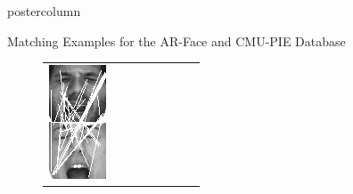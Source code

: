 \documentclass[final,hyperref={pdfpagelabels=false}]{beamer}
\begin{document}
\begin{frame}
\begin{columns}
\begin{column}{.49\textwidth}
\begin{beamercolorbox}[center,wd=\textwidth]{postercolumn}
\begin{minipage}[T]{.95\textwidth}
{\begin{block}{Matching Examples for the AR-Face and CMU-PIE Database}
\begin{figure}
\begin{tabular}{p{.09\linewidth} | p{.12\linewidth} | p{.12\linewidth} | p{.12\linewidth} || p{.12\linewidth} | p{.12\linewidth} | p{.12\linewidth} | p{.09\linewidth} }
                  \includegraphics[width=1.0\linewidth]{paper/bmvc09-surf/figures/matchings/arface-sift/maximum_m-005-17.pgm--w-052-4}
                  &

\end{tabular}
\end{figure}
\end{block}}
\end{minipage}
\end{beamercolorbox}
\end{column}
\end{columns}
\end{frame}
\end{document}
